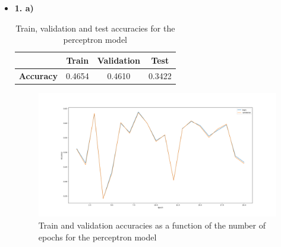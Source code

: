 \documentclass[12pt]{article}
\begin{document}
\begin{itemize}
    \item \textbf{1. a)}
          \begin{table}[H]
              \centering
              \begin{tabular}{|c|c|c|c|}
                  \toprule
                                    & \textbf{Train} & \textbf{Validation} & \textbf{Test} \\
                  \midrule
                  \textbf{Accuracy} & 0.4654         & 0.4610              & 0.3422        \\
                  \bottomrule
              \end{tabular}
              \label{tab:1.1a}
              \caption{Train, validation and test accuracies for the perceptron model}
          \end{table}

          \begin{figure}[H]
              \centering
              \includegraphics[width=1\linewidth]{../outputs/hw1-q1-1a.png}
              \caption{Train and validation accuracies as a function of the number of epochs for the perceptron model}
              \label{fig:1.1a}
          \end{figure}
          \clearpage


\end{itemize}
\end{document}
